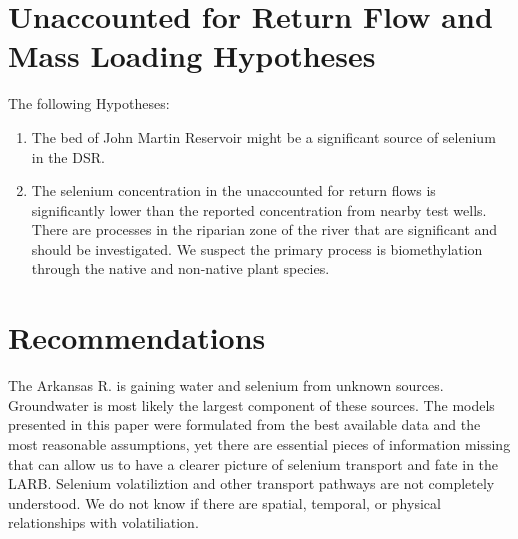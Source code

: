 \begin{linenumbers}
\clearpage{}
\section{Unaccounted for Return Flow and Mass Loading Hypotheses}
\label{sec:FlowAndMassConclusions}

The following Hypotheses:
\begin{enumerate}
	\item The bed of John Martin Reservoir might be a significant source of selenium in the DSR.
	\item The selenium concentration in the unaccounted for return flows is significantly lower than the reported concentration from nearby test wells.  There are processes in the riparian zone of the river that are significant and should be investigated.  We suspect the primary process is biomethylation through the native and non-native plant species.
\end{enumerate}
\clearpage{}

\section{Recommendations}
\label{sec:Recommendations}

The Arkansas R. is gaining water and selenium from unknown sources.  Groundwater is most likely the largest component of these sources.  The models presented in this paper were formulated from the best available data and the most reasonable assumptions, yet there are essential pieces of information missing that can allow us to have a clearer picture of selenium transport and fate in the LARB.  Selenium volatiliztion and other transport pathways are not completely understood.  We do not know if there are spatial, temporal, or physical relationships with volatiliation.


\end{linenumbers}

